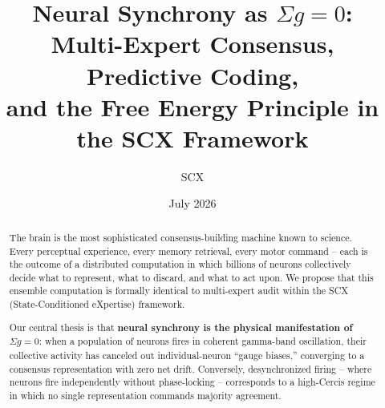 \documentclass[12pt,a4paper]{article}
\title{\textbf{Neural Synchrony as $\Sigma g = 0$:} \\
       \large Multi-Expert Consensus, Predictive Coding, \\
       \large and the Free Energy Principle in the SCX Framework}
\author{SCX}
\date{July 2026}
\theoremstyle{remark}
\newcommand{\SCX}{\textsf{SCX}}
\newcommand{\Cercis}{\textsf{Cercis}}
\begin{document}
\maketitle

\begin{abstract}
\noindent
The brain is the most sophisticated consensus-building machine known to science.
Every perceptual experience, every memory retrieval, every motor command -- each
is the outcome of a distributed computation in which billions of neurons
collectively decide what to represent, what to discard, and what to act upon.
We propose that this ensemble computation is formally identical to multi-expert
audit within the \SCX{} (State-Conditioned eXpertise) framework.

Our central thesis is that \textbf{neural synchrony is the physical
manifestation of $\Sigma g = 0$}: when a population of neurons fires in
coherent gamma-band oscillation, their collective activity has canceled out
individual-neuron ``gauge biases,'' converging to a consensus representation
with zero net drift. Conversely, desynchronized firing -- where neurons fire
independently without phase-locking -- corresponds to a high-\Cercis{} regime
in which no single representation commands majority agreement.


\end{abstract}
\end{document}
